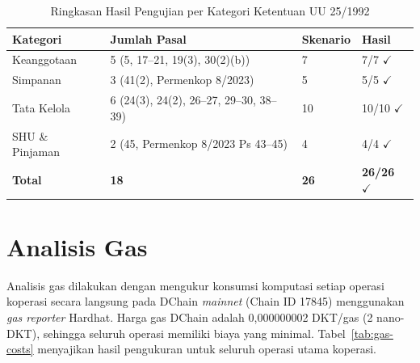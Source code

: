 \begin{table}[H]
\centering
\caption{Ringkasan Hasil Pengujian per Kategori Ketentuan UU 25/1992}
\label{tab:category-summary}
\begin{tabular}{p{}p{}p{}p{}}
\toprule
\textbf{Kategori} & \textbf{Jumlah Pasal} & \textbf{Skenario} & \textbf{Hasil} \\
\midrule
Keanggotaan & 5 (5, 17--21, 19(3), 30(2)(b)) & 7 & 7/7 $\checkmark$ \\
Simpanan & 3 (41(2), Permenkop 8/2023) & 5 & 5/5 $\checkmark$ \\
Tata Kelola & 6 (24(3), 24(2), 26--27, 29--30, 38--39) & 10 & 10/10 $\checkmark$ \\
SHU \& Pinjaman & 2 (45, Permenkop 8/2023 Ps 43--45) & 4 & 4/4 $\checkmark$ \\
\midrule
\textbf{Total} & \textbf{18} & \textbf{26} & \textbf{26/26 $\checkmark$} \\
\bottomrule
\end{tabular}
\end{table}

\section{Analisis Gas}

Analisis gas dilakukan dengan mengukur konsumsi komputasi setiap operasi koperasi secara langsung pada DChain \textit{mainnet} (Chain ID 17845) menggunakan \textit{gas reporter} Hardhat. Harga gas DChain adalah 0,000000002 DKT/gas (2 nano-DKT), sehingga seluruh operasi memiliki biaya yang minimal. Tabel~\ref{tab:gas-costs} menyajikan hasil pengukuran untuk seluruh operasi utama koperasi.

